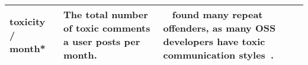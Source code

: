 {\begin{tabular}{|p{1.9cm}|p{5.5cm}|p{11.2cm}|}
    toxicity / month* & The total number of toxic comments a user posts per month. & ~\cite{miller2022did} found many repeat offenders, as many OSS developers have toxic communication styles~\cite{miller2022did,leaving-for-toxicity}.   \\  \hline






    \end{tabular}
    }
    
%